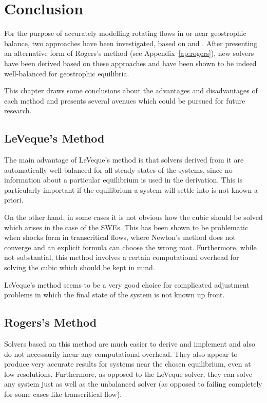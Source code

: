 \chapter{Conclusion}
\label{ch:conclusion}

For the purpose of accurately modelling rotating flows in or near geostrophic balance, two approaches have been investigated, based on \citet{leveque1998balancing} and \citet{rogers2003mathematical}. After presenting an alternative form of Rogers's method (see Appendix~\ref{ap:rogers}), new solvers have been derived based on these approaches and have been shown to be indeed well-balanced for geostrophic equilibria.

This chapter draws some conclusions about the advantages and disadvantages of each method and presents several avenues which could be pursued for future research.

\section{LeVeque's Method}

The main advantage of LeVeque's method is that solvers derived from it are automatically well-balanced for all steady states of the systems, since no information about a particular equilibrium is used in the derivation. This is particularly important if the equilibrium a system will settle into is not known a priori.

On the other hand, in some cases it is not obvious how the cubic should be solved which arises in the case of the SWEs. This has been shown to be problematic when shocks form in transcritical flows, where Newton's method does not converge and an explicit formula can choose the wrong root. Furthermore, while not substantial, this method involves a certain computational overhead for solving the cubic which should be kept in mind.

LeVeque's method seems to be a very good choice for complicated adjustment problems in which the final state of the system is not known up front.

\section{Rogers's Method}

Solvers based on this method are much easier to derive and implement and also do not necessarily incur any computational overhead. They also appear to produce very accurate results for systems near the chosen equilibrium, even at low resolutions. Furthermore, as opposed to the LeVeque solver, they can solve any system just as well as the unbalanced solver (as opposed to failing completely for some cases like transcritical flow).

